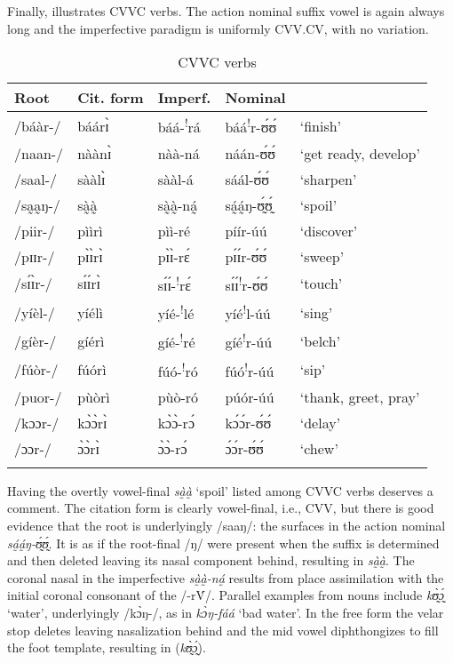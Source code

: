 \documentclass[output=paper,newtxmath,modfonts,nonflat,draftmode]{langsci/langscibook}
\begin{document}
     Finally,  illustrates CVVC verbs. The action nominal suffix vowel is again always long and the imperfective paradigm is uniformly CVV.CV, with no variation.

\begin{table}
\begin{tabularx}{\textwidth}{llXXl}
\lsptoprule
 {Root} & {Cit. form} & {Imperf.} & {Nominal} & \\
\midrule
/báàr-/&	báárɪ̀&	báá-\textsuperscript{!}rá&	báá\textsuperscript{!}r-ʊ́ʊ́&	‘finish’\\
/naan-/&	nàànɪ̀&	nàà-ná	&	náán-ʊ́ʊ́&	‘get ready, develop’\\
/saal-/&	sààlɪ̀&	sààl-á&	sáál-ʊ́ʊ́ &	‘sharpen’\\
/sa̰a̰ŋ-/&	sà̰à̰&	sà̰à̰-ná̰&	sá̰á̰ŋ-ʊ̰́ʊ̰́&	‘spoil’\\
/piir-/&	pììrì&	pìì-ré&	píír-úú&	‘discover’\\
/pɪɪr-/&	pɪ̀ɪ̀rɪ̀&	pɪ̀ɪ̀-rɛ́&	pɪ́ɪ́r-ʊ́ʊ́&	‘sweep’\\
/sɪ́ɪ̀r-/&	sɪ́ɪ́rɪ̀&	sɪ́ɪ́-\textsuperscript{!}rɛ́&	sɪ́ɪ́\textsuperscript{!}r-ʊ́ʊ́&	‘touch’\\
/yíèl-/&	yíélì&	yíé-\textsuperscript{!}lé&	yíé\textsuperscript{!}l-úú&	‘sing’\\
/gíèr-/&	gíérì&	gíé-\textsuperscript{!}ré&	gíé\textsuperscript{!}r-úú&	‘belch’\\
/fúòr-/&	fúórì&	fúó-\textsuperscript{!}ró&	fúó\textsuperscript{!}r-úú&	‘sip’\\
/puor-/&	pùòrì&	pùò-ró	&	púór-úú&	‘thank, greet, pray’\\
/kɔɔr-/&	kɔ̀ɔ̀rɪ̀&	kɔ̀ɔ̀-rɔ́&	kɔ́ɔ́r-ʊ́ʊ́&	‘delay’\\
/ɔɔr-/&	ɔ̀ɔ̀rɪ̀&	ɔ̀ɔ̀-rɔ́&	ɔ́ɔ́r-ʊ́ʊ́&	‘chew’\\
\lspbottomrule
\end{tabularx}
\caption{CVVC verbs}
\label{tab:anttila:11}
\end{table}


Having the overtly vowel-final \textit{sà̰à̰} ‘spoil’ listed among CVVC verbs deserves a comment. The citation form is clearly vowel-final, i.e., CVV, but there is good evidence that the root is underlyingly /saaŋ/: the  surfaces in the action nominal \textit{sá̰á̰ŋ-ʊ̰́ʊ̰́}. It is as if the root-final /ŋ/ were present when the suffix  is determined and then deleted leaving its nasal component behind, resulting in \textit{sà̰à̰}. The coronal nasal in the imperfective \textit{sà̰à̰-ná̰} results from place assimilation with the initial coronal consonant of the  /-r\'{V}/. Parallel examples from nouns include \textit{kʊ̰̀ɔ̰́} ‘water’, underlyingly /kɔ̀ŋ-/, as in \textit{kɔ̀ŋ-fáá} ‘bad water’. In the free form the velar stop deletes leaving nasalization behind and the mid vowel diphthongizes to fill the foot template, resulting in (\textit{kʊ̰̀ɔ̰́}).
\end{document}
